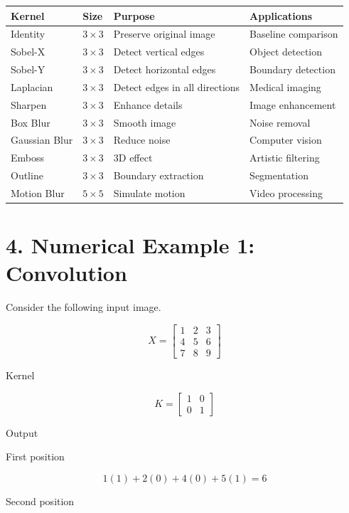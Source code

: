 \documentclass[11pt]{article}
\begin{document}
\begin{center}
\renewcommand{\arraystretch}{1.3}
\begin{tabular}{|p{3cm}|p{2cm}|p{4cm}|p{4cm}|}
\hline
\textbf{Kernel} & \textbf{Size} & \textbf{Purpose} & \textbf{Applications}\\
\hline
Identity & $3\times3$ & Preserve original image & Baseline comparison\\
\hline
Sobel-X & $3\times3$ & Detect vertical edges & Object detection\\
\hline
Sobel-Y & $3\times3$ & Detect horizontal edges & Boundary detection\\
\hline
Laplacian & $3\times3$ & Detect edges in all directions & Medical imaging\\
\hline
Sharpen & $3\times3$ & Enhance details & Image enhancement\\
\hline
Box Blur & $3\times3$ & Smooth image & Noise removal\\
\hline
Gaussian Blur & $3\times3$ & Reduce noise & Computer vision\\
\hline
Emboss & $3\times3$ & 3D effect & Artistic filtering\\
\hline
Outline & $3\times3$ & Boundary extraction & Segmentation\\
\hline
Motion Blur & $5\times5$ & Simulate motion & Video processing\\
\hline
\end{tabular}
\end{center}

\section*{4. Numerical Example 1: Convolution}

Consider the following input image.

\[
X=
\begin{bmatrix}
1&2&3\\
4&5&6\\
7&8&9
\end{bmatrix}
\]

Kernel

\[
K=
\begin{bmatrix}
1&0\\
0&1
\end{bmatrix}
\]

Output

First position

\[
1(1)+2(0)+4(0)+5(1)=6
\]

Second position
\end{document}
